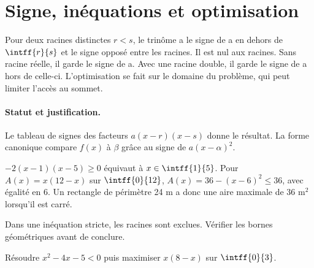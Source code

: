 \section{Signe, inéquations et optimisation}\label{C02-U4}
\begin{keypoint}
Pour deux racines distinctes $r<s$, le trinôme a le signe de a en dehors de $\intff{r}{s}$ et le signe opposé entre les racines. Il est nul aux racines. Sans racine réelle, il garde le signe de a. Avec une racine double, il garde le signe de a hors de celle-ci. L’optimisation se fait sur le domaine du problème, qui peut limiter l’accès au sommet.
\end{keypoint}
\paragraph{Statut et justification.} Le tableau de signes des facteurs $a(x-r)(x-s)$ donne le résultat. La forme canonique compare $f(x)$ à $\beta$ grâce au signe de $a(x-\alpha)^2$.
\begin{example}$-2(x-1)(x-5)\geq0$ équivaut à $x\in\intff{1}{5}$. Pour $A(x)=x(12-x)$ sur $\intff{0}{12}$, $A(x)=36-(x-6)^2\leq36$, avec égalité en 6. Un rectangle de périmètre 24 m a donc une aire maximale de 36 m$^2$ lorsqu’il est carré.\end{example}\label{C02-EX4}
\begin{pitfall}Dans une inéquation stricte, les racines sont exclues. Vérifier les bornes géométriques avant de conclure.\end{pitfall}
\begin{application}Résoudre $x^2-4x-5<0$ puis maximiser $x(8-x)$ sur $\intff{0}{3}$.\end{application}\label{C02-AP4}
\mxnewpage
